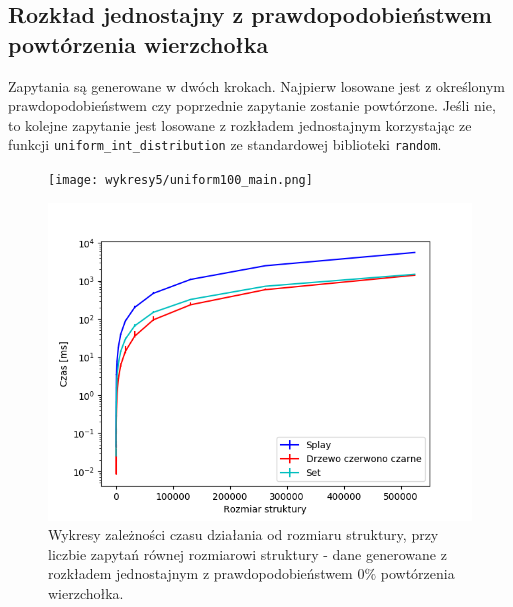 \documentclass[declaration,shortabstract]{iithesis}
\theoremstyle{thm}
\theoremstyle{remark}
\theoremstyle{plain}
\theoremstyle{plain}
\theoremstyle{plain}
\begin{document}
\subsection{Rozkład jednostajny z prawdopodobieństwem powtórzenia wierzchołka}
Zapytania są generowane w dwóch krokach. Najpierw losowane jest z określonym prawdopodobieństwem czy poprzednie zapytanie zostanie powtórzone. Jeśli nie, to kolejne zapytanie jest losowane z rozkładem jednostajnym korzystając ze funkcji \texttt{uniform\_int\_distribution} ze standardowej biblioteki \texttt{random}. 

\begin{figure}[ht]
\begin{minipage}[b]{.45\textwidth}
\centering
\texttt{[image: wykresy5/uniform100\_main.png]}
\end{minipage}
\hfill
\begin{minipage}[b]{.45\textwidth}
\centering
\includegraphics[width=1\textwidth]{wykresy3/uniform100_main.png}
\end{minipage}
\caption{Wykresy zależności czasu działania od rozmiaru struktury, przy liczbie zapytań równej rozmiarowi struktury - dane generowane z rozkładem jednostajnym z prawdopodobieństwem  \(0\%\) powtórzenia wierzchołka.}
\end{figure}
\end{document}
